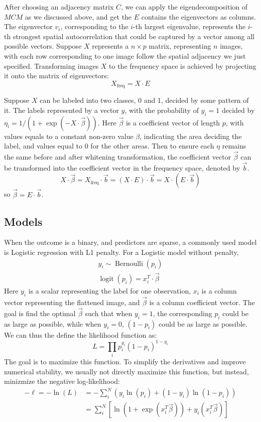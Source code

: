 \documentclass[12pt]{article}
\begin{document}
After choosing an adjacency matrix \( C \), we can apply the eigendecomposition of \( M C M \) as we discussed above, and get the \( E \) contains the eigenvectors as columns. The eigenvector \( v_i \), corresponding to the \( i \)-th largest eigenvalue, represents the \( i \)-th strongest spatial autocorrelation that could be captured by a vector among all possible vectors. Suppose \( X \) represents a \( n \times p \) matrix, representing \( n \) images, with each row corresponding to one image follow the spatial adjacency we just specified. Transforming images \( X \) to the frequency space is achieved by projecting it onto the matrix of eigenvectors:
\[
  X_{\text{freq}} = X \cdot E
\]

Suppose \( X \) can be labeled into two classes, 0 and 1, decided by some pattern of it. The labels represented by a vector \( y \), with the probability of \( y_i = 1 \) decided by \( \eta_i = 1 / (1 + \exp(-X \cdot \vec{\beta})) \). Here \( \vec{\beta} \) is a coefficient vector of length \( p \), with values equals to a constant non-zero value \( \beta \), indicating the area deciding the label, and values equal to 0 for the other areas. Then to ensure each \( \eta \) remains the same before and after whitening transformation, the coefficient vector \( \vec{\beta} \) can be transformed into the coefficient vector in the frequency space, denoted by \( \vec{b} \).
\[
  X \cdot \vec{\beta} = X_{\text{freq}} \cdot \vec{b} = (X \cdot E) \cdot \vec{b} = X \cdot (E \cdot \vec{b})
\]
so \( \vec{\beta} = E \cdot \vec{b} \).


\subsection{Models}

When the outcome is a binary, and predictors are sparse, a commonly used model is Logistic regression with L1 penalty. For a Logistic model without penalty,
\[
  \begin{gathered}
    y_i \sim \operatorname{Bernoulli} (p_i) \\
    \operatorname{logit} (p_i) = x_i^T \cdot \vec{\beta}
  \end{gathered}
\]
Here \( y_i \) is a scalar representing the label for one observation, \( x_i \) is a column vector representing the flattened image, and \( \vec{\beta} \) is a column coefficient vector. The goal is find the optimal \( \vec{\beta} \) such that when \( y_i = 1 \), the corresponding \( p_i \) could be as large as possible, while when \( y_i = 0 \), \( (1 - p_i) \) could be as large as possible. We can thus the define the likelihood function as:
\[
  L = \prod_i p_i^{y_i} (1 - p_i)^{1 - y_i}
\]
The goal is to maximize this function. To simplify the derivatives and improve numerical stability, we usually not directly maximize this function, but instead, minizmize the negative log-likelihood:
\[
  \begin{aligned}
    - \ell = - \ln(L) & =  - \sum_i^N (y_i \ln(p_i) + (1 - y_i) \ln(1 - p_i) ) \\
                      & = \sum_i^N \left[ \ln \left(1 + \exp(x_i^T \vec{\beta}) \right) + y_i (x_i^T \vec{\beta}) \right]
  \end{aligned}
\]
\end{document}
